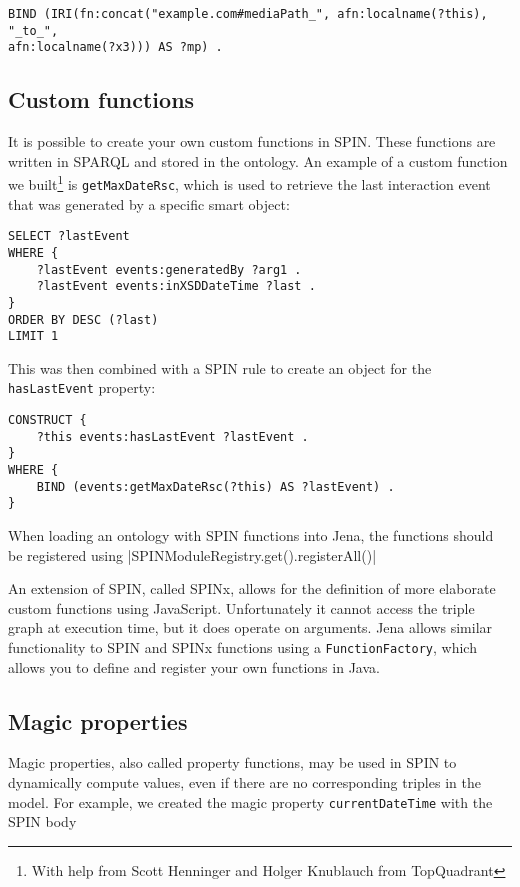 {\footnotesize
\begin{verbatim}
BIND (IRI(fn:concat("example.com#mediaPath_", afn:localname(?this), "_to_",
afn:localname(?x3))) AS ?mp) .	
\end{verbatim}
}

\subsection{Custom functions}

It is possible to create your own custom functions in \ac{SPIN}. These functions are written in \ac{SPARQL} and stored in the ontology. An example of a custom function we built\footnote{With help from Scott Henninger and Holger Knublauch from TopQuadrant} is \texttt{getMaxDateRsc}, which is used to retrieve the last interaction event that was generated by a specific smart object:

\begin{verbatim}
SELECT ?lastEvent
WHERE {
    ?lastEvent events:generatedBy ?arg1 .
    ?lastEvent events:inXSDDateTime ?last .
}
ORDER BY DESC (?last)
LIMIT 1
\end{verbatim}

This was then combined with a \ac{SPIN} rule to create an object for the \texttt{hasLastEvent} property:

\begin{verbatim}
CONSTRUCT {
    ?this events:hasLastEvent ?lastEvent .
}
WHERE {
    BIND (events:getMaxDateRsc(?this) AS ?lastEvent) .
}
\end{verbatim}


When loading an ontology with SPIN functions into Jena, the functions should be registered using |SPINModuleRegistry.get().registerAll()|

An extension of \ac{SPIN}, called SPINx, allows for the definition of more elaborate custom functions using JavaScript. Unfortunately it cannot access the triple graph at execution time, but it does operate on arguments. Jena allows similar functionality to \ac{SPIN} and SPINx functions using a \texttt{FunctionFactory}, which allows you to define and register your own functions in Java.

\subsection{Magic properties}
\label{magicproperties}
Magic properties, also called property functions, may be used in \ac{SPIN} to dynamically compute values, even if there are no corresponding triples in the model. For example, we created the magic property \texttt{currentDateTime} with the \ac{SPIN} body

